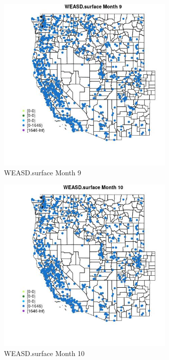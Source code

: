 \begin{figure} 
\centering  
\includegraphics[width=0.77\textwidth]{Code_Outputs/Report_ML_input_PM25_Step4_part_f_de_duplicated_aveswNAs_MapObsMo9WEASDsurface.jpg} 
\caption{\label{fig:Report_ML_input_PM25_Step4_part_f_de_duplicated_aveswNAsMapObsMo9WEASDsurface}WEASD.surface Month 9} 
\end{figure} 
 

\clearpage 

\begin{figure} 
\centering  
\includegraphics[width=0.77\textwidth]{Code_Outputs/Report_ML_input_PM25_Step4_part_f_de_duplicated_aveswNAs_MapObsMo10WEASDsurface.jpg} 
\caption{\label{fig:Report_ML_input_PM25_Step4_part_f_de_duplicated_aveswNAsMapObsMo10WEASDsurface}WEASD.surface Month 10} 
\end{figure} 
 

